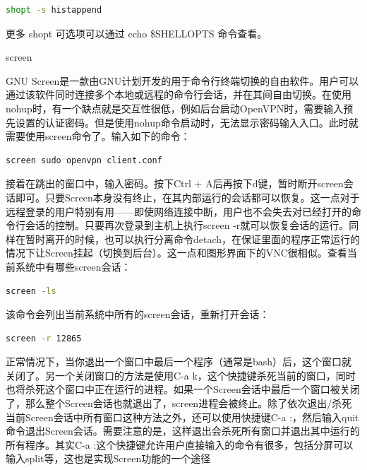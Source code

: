 \documentclass[11pt,fleqn]{book}
\makeatletter
\numberwithin{dummy}{section}
\theoremstyle{ocrenumbox}
\theoremstyle{blacknumex}
\theoremstyle{blacknumbox}
\theoremstyle{ocrenum}
\renewcommand{\subsubsection}{\@startsection {subsubsection}{3}{\z@}
	{-2ex \@plus -0.1ex \@minus -.2ex}
	{.2ex \@plus.2ex }
	{\normalfont\small\sffamily\bfseries}}
\makeatother
\begin{document}
\begin{lstlisting}[language=Bash]
shopt -s histappend
\end{lstlisting}

更多 shopt 可选项可以通过 echo \$SHELLOPTS 命令查看。



\subsubsection{screen}

GNU Screen是一款由GNU计划开发的用于命令行终端切换的自由软件。用户可以通过该软件同时连接多个本地或远程的命令行会话，并在其间自由切换。在使用nohup时，有一个缺点就是交互性很低，例如后台启动OpenVPN时，需要输入预先设置的认证密码。但是使用nohup命令启动时，无法显示密码输入入口。此时就需要使用screen命令了。输入如下的命令：

\begin{lstlisting}[language=Bash]
screen sudo openvpn client.conf
\end{lstlisting}

接着在跳出的窗口中，输入密码。按下Ctrl + A后再按下d键，暂时断开screen会话即可。只要Screen本身没有终止，在其内部运行的会话都可以恢复。这一点对于远程登录的用户特别有用——即使网络连接中断，用户也不会失去对已经打开的命令行会话的控制。只要再次登录到主机上执行screen -r就可以恢复会话的运行。同样在暂时离开的时候，也可以执行分离命令detach，在保证里面的程序正常运行的情况下让Screen挂起（切换到后台）。这一点和图形界面下的VNC很相似。查看当前系统中有哪些screen会话：

\begin{lstlisting}[language=Bash]
screen -ls
\end{lstlisting}

该命令会列出当前系统中所有的screen会话，重新打开会话：

\begin{lstlisting}[language=Bash]
screen -r 12865
\end{lstlisting}

正常情况下，当你退出一个窗口中最后一个程序（通常是bash）后，这个窗口就关闭了。另一个关闭窗口的方法是使用C-a k，这个快捷键杀死当前的窗口，同时也将杀死这个窗口中正在运行的进程。如果一个Screen会话中最后一个窗口被关闭了，那么整个Screen会话也就退出了，screen进程会被终止。除了依次退出/杀死当前Screen会话中所有窗口这种方法之外，还可以使用快捷键C-a :，然后输入quit命令退出Screen会话。需要注意的是，这样退出会杀死所有窗口并退出其中运行的所有程序。其实C-a :这个快捷键允许用户直接输入的命令有很多，包括分屏可以输入split等，这也是实现Screen功能的一个途径
\end{document}
